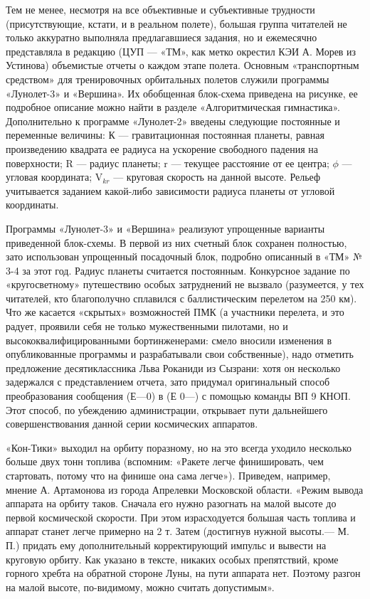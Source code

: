 \documentclass[11pt,a4paper,oneside]{article}
\begin{document}
Тем не менее, несмотря на все объективные и субъективные трудности (присутствующие, кстати, и в реальном полете), большая группа читателей не только аккуратно выполняла предлагавшиеся задания, но и ежемесячно представляла в редакцию (ЦУП — «ТМ», как метко окрестил КЭИ А. Морев из Устинова) объемистые отчеты о каждом этапе полета. Основным «транспортным средством» для тренировочных орбитальных полетов служили программы «Лунолет-3» и «Вершина». Их обобщенная блок-схема приведена на рисунке, ее подробное описание можно найти в разделе «Алгоритмическая гимнастика». Дополнительно к программе «Лунолет-2» введены следующие постоянные и переменные величины: К — гравитационная постоянная планеты, равная произведению квадрата ее радиуса на ускорение свободного падения на поверхности; R — радиус планеты; r — текущее расстояние от ее центра; $\phi$ — угловая координата; V$_{kr}$ — круговая скорость на данной высоте. Рельеф учитывается заданием какой-либо зависимости радиуса планеты от угловой координаты.

Программы «Лунолет-3» и «Вершина» реализуют упрощенные варианты приведенной блок-схемы. В первой из них счетный блок сохранен полностью, зато использован упрощенный посадочный блок, подробно описанный в «ТМ» № 3-4 за этот год. Радиус планеты считается постоянным. Конкурсное задание по «кругосветному» путешествию особых затруднений не вызвало (разумеется, у тех читателей, кто благополучно сплавился с баллистическим перелетом на 250 км). Что же касается «скрытых» возможностей ПМК (а участники перелета, и это радует, проявили себя не только мужественными пилотами, но и высококвалифицированными бортинженерами: смело вносили изменения в опубликованные программы и разрабатывали свои собственные), надо отметить предложение десятиклассника Льва Роканиди из Сызрани: хотя он несколько задержался с представлением отчета, зато придумал оригинальный способ преобразования сообщения (Е—0) в (Е 0—) с помощью команды ВП 9 КНОП. Этот способ, по убеждению администрации, открывает пути дальнейшего совершенствования данной серии космических аппаратов.

«Кон-Тики» выходил на орбиту поразному, но на это всегда уходило несколько больше двух тонн топлива (вспомним: «Ракете легче финишировать, чем стартовать, потому что на финише она сама легче»). Приведем, например, мнение А. Артамонова из города Апрелевки Московской области. «Режим вывода аппарата на орбиту таков. Сначала его нужно разогнать на малой высоте до первой космической скорости. При этом израсходуется большая часть топлива и аппарат станет легче примерно на 2 т. Затем (достигнув нужной высоты.— М. П.) придать ему дополнительный корректирующий импульс и вывести на круговую орбиту. Как указано в тексте, никаких особых препятствий, кроме горного хребта на обратной стороне Луны, на пути аппарата нет. Поэтому разгон на малой высоте, по-видимому, можно считать допустимым».
\end{document}
